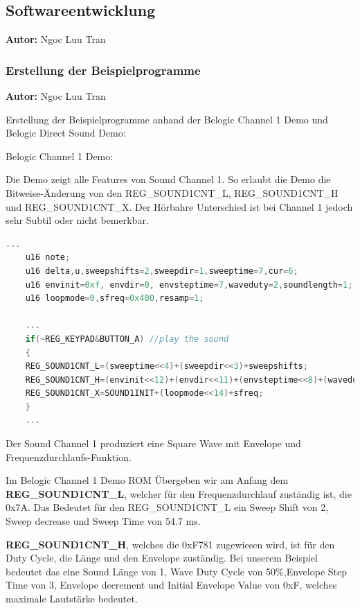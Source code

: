 \documentclass[11pt,a4paper]{scrartcl}
\newcommand{\AutorNgoc} {
    \vspace{-4mm}
    \large \textbf{Autor:} Ngoc Luu Tran \normalsize
    \vspace{2mm}
}
\begin{document}

\subsection{Softwareentwicklung} \label{Softwareentwicklung}
\AutorNgoc

\subsubsection{Erstellung der Beispielprogramme}
\AutorNgoc

Erstellung der Beispielprogramme anhand der Belogic Channel 1 Demo und Belogic Direct Sound Demo:

Belogic Channel 1 Demo:

Die Demo zeigt alle Features von Sound Channel 1. So erlaubt die Demo die Bitweise-\"{A}nderung von den REG\_SOUND1CNT\_L, REG\_SOUND1CNT\_H und REG\_SOUND1CNT\_X. Der H\"{o}rbahre Unterschied ist bei Channel 1 jedoch sehr Subtil oder nicht bemerkbar.


\vspace{5mm}
\begin{lstlisting}[language=C++, caption={Belogic Channel 1 Demo}, label={list:channel1}]
	...
	u16 note;
	u16 delta,u,sweepshifts=2,sweepdir=1,sweeptime=7,cur=6;
	u16 envinit=0xf, envdir=0, envsteptime=7,waveduty=2,soundlength=1;
	u16 loopmode=0,sfreq=0x400,resamp=1;

    ...
	if(~REG_KEYPAD&BUTTON_A) //play the sound
	{ 
	REG_SOUND1CNT_L=(sweeptime<<4)+(sweepdir<<3)+sweepshifts;
	REG_SOUND1CNT_H=(envinit<<12)+(envdir<<11)+(envsteptime<<8)+(waveduty<<6)+soundlength;
	REG_SOUND1CNT_X=SOUND1INIT+(loopmode<<14)+sfreq;
	}
	...
\end{lstlisting}

Der Sound Channel 1 produziert eine Square Wave mit Envelope und Frequenzdurchlaufs-Funktion. 

Im Belogic Channel 1 Demo ROM \"{U}bergeben wir am Anfang dem \textbf{REG\_SOUND1CNT\_L}, welcher f\"{u}r den Frequenzdurchlauf zust\"{a}ndig ist, die 0x7A. Das Bedeutet f\"{u}r den REG\_SOUND1CNT\_L ein Sweep Shift von 2, Sweep decrease und Sweep Time von 54.7 ms.


\textbf{REG\_SOUND1CNT\_H}, welches die 0xF781 zugewiesen wird, ist f\"{u}r den Duty Cycle, die L\"{a}nge und den Envelope zust\"{a}ndig. Bei unserem Beispiel bedeutet das eine Sound L\"{a}nge von 1, Wave Duty Cycle von 50\%,Envelope Step Time von 3, Envelope decrement und Initial Envelope Value von 0xF, welches maximale Lautst\"{a}rke bedeutet.
\end{document}
